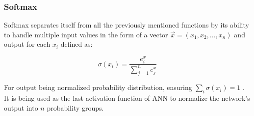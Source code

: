 \subsubsection{Softmax}

Softmax separates itself from all the previously mentioned functions by its ability to handle multiple input values in the form of a vector $\vec{x} = (x_1,x_2,...,x_n)$ and output for each $x_i$ defined as:

\begin{equation}
    {\sigma(x_i) = \frac{e^x_i}{\sum_{j=1}^{n}e^x_j}}
\end{equation}


For output being normalized probability distribution, ensuring $\sum_{i}\sigma(x_i) = 1$ \cite{lipton2015critical}. It is being used as the last activation function of ANN to normalize the network's output into $n$ probability groups.
